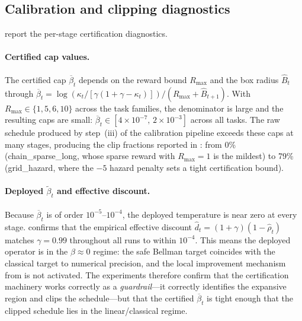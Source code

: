\documentclass{article}
\theoremstyle{remark}
\begin{document}
\subsection{Calibration and clipping diagnostics}
\label{sec:exp-calib}

 report the per-stage certification diagnostics.

\paragraph{Certified cap values.}
The certified cap $\overline\beta_t$ depends on the reward bound $R_{\max}$ and the box radius $\hat{B}_t$ through $\overline\beta_t = \log(\kappa_t / [\gamma(1+\gamma-\kappa_t)]) / (R_{\max}+\hat{B}_{t+1})$.
With $R_{\max}\in\{1,5,6,10\}$ across the task families, the denominator is large and the resulting caps are small: $\overline\beta_t\in[4\times10^{-7},\,2\times10^{-3}]$ across all tasks.
The raw schedule produced by step~(iii) of the calibration pipeline exceeds these caps at many stages, producing the clip fractions reported in : from 0\% (chain\_sparse\_long, whose sparse reward with $R_{\max}=1$ is the mildest) to 79\% (grid\_hazard, where the $-5$ hazard penalty sets a tight certification bound).

\paragraph{Deployed $\widetilde\beta_t$ and effective discount.}
Because $\overline\beta_t$ is of order $10^{-5}$--$10^{-4}$, the deployed temperature is near zero at every stage.
 confirms that the empirical effective discount $\hat{d}_t = (1+\gamma)(1-\hat\rho_t)$ matches $\gamma=0.99$ throughout all runs to within $10^{-4}$.
This means the deployed operator is in the $\beta\approx 0$ regime: the safe Bellman target coincides with the classical target to numerical precision, and the local improvement mechanism from  is not activated.
The experiments therefore confirm that the certification machinery works correctly as a \emph{guardrail}---it correctly identifies the expansive region and clips the schedule---but that the certified $\overline\beta_t$ is tight enough that the clipped schedule lies in the linear/classical regime.

\begin{table}[t]
\centering
\small
\caption{Clipping diagnostics: per-task-family mean clip fraction, mean effective discount, and mean deployed $|\widetilde\beta|$ (averaged over stages and seeds).}
\label{tab:clip-activity}

\end{table}
\end{document}
